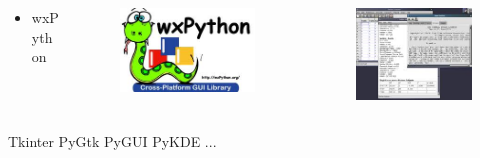 \documentclass[compress=true]{beamer}
\begin{document}
\begin{frame}
\begin{columns}
\begin{column}{0.2\textwidth}
			\begin{itemize}
				\item wxPython
			\end{itemize}
		\end{column}
		\begin{column}{0.4\textwidth}
			\begin{figure}
				\includegraphics[height=0.3\textheight]{wxPython.png}
			\end{figure}
		\end{column}
		\begin{column}{0.4\textwidth}
			\begin{figure}
				\includegraphics[height=0.3\textheight]{wxpython_1.png}\\
			\end{figure}
		\end{column}
	\end{columns}
	\begin{flushleft}
	Tkinter PyGtk PyGUI PyKDE ...
\end{flushleft}
\end{frame}
\end{document}
